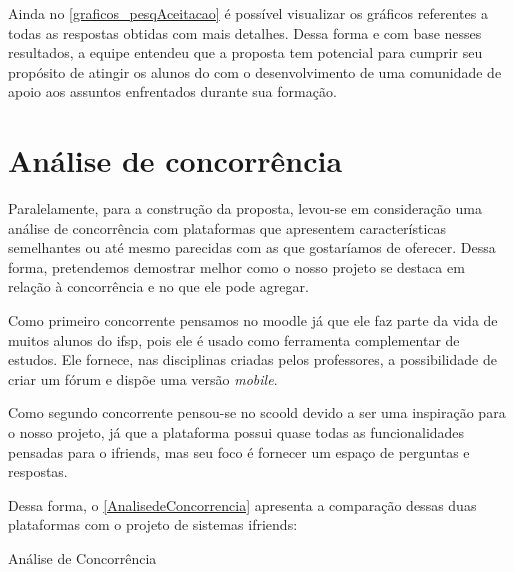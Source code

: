 Ainda no \autoref{graficos_pesqAceitacao} é possível visualizar os gráficos referentes a todas as respostas obtidas com mais detalhes. Dessa forma e com base nesses resultados, a equipe entendeu que a proposta tem potencial para cumprir seu propósito de atingir os alunos do  com o desenvolvimento de uma comunidade de apoio aos assuntos enfrentados durante sua formação.

\section{Análise de concorrência}
Paralelamente, para a construção da proposta, levou-se em consideração uma análise de concorrência com plataformas que apresentem características semelhantes ou até mesmo parecidas com as que gostaríamos de oferecer. Dessa forma, pretendemos demostrar melhor como o nosso projeto se destaca em relação à concorrência e no que ele pode agregar.

Como primeiro concorrente pensamos no \gls{moodle} já que ele faz parte da vida de muitos alunos do \acs{ifsp}, pois ele é usado como ferramenta complementar de estudos. Ele fornece, nas disciplinas criadas pelos professores, a possibilidade de criar um fórum e dispõe uma versão \textsl{mobile}.

Como segundo concorrente pensou-se no \gls{scoold} devido a ser uma inspiração para o nosso projeto, já que a plataforma possui quase todas as funcionalidades pensadas para o \gls{ifriends}, mas seu foco é fornecer um espaço de perguntas e respostas. 

Dessa forma, o \autoref{AnalisedeConcorrencia} apresenta a comparação dessas duas plataformas com o projeto de sistemas \gls{ifriends}:

\def\arraystretch{2}
\begin{quadro}[htb]
\centering
\ABNTEXfontereduzida
\caption{Análise de Concorrência}
\label{AnalisedeConcorrencia}
\end{quadro}
\FloatBarrier

